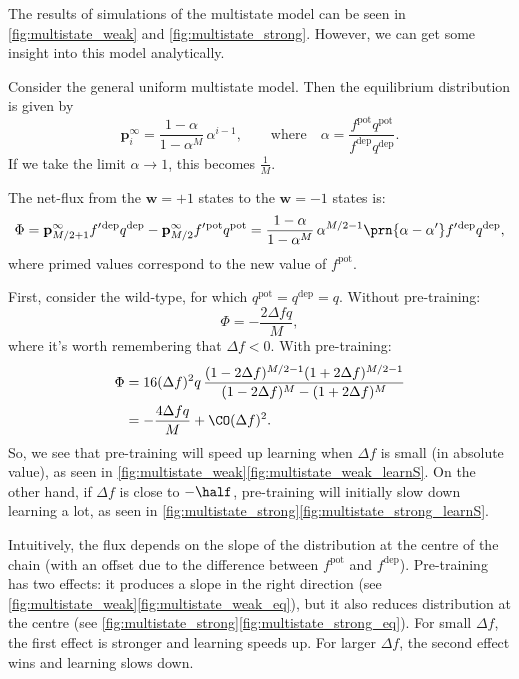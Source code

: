 \documentclass[12pt]{article}
\newcommand{\pr}{\mathbf{p}}
\newcommand{\eq}{\pr^\infty}
\newcommand{\w}{\mathbf{w}}
\newcommand{\pot}{^{\text{pot}}}
\newcommand{\dep}{^{\text{dep}}}
\begin{document}
The results of simulations of the multistate model can be seen in \autoref{fig:multistate_weak} and \autoref{fig:multistate_strong}.
However, we can get some insight into this model analytically.



Consider the general uniform multistate model.
Then the equilibrium distribution is given by
%
\begin{equation}\label{eq:mutltieq}
  \eq_i = \frac{1-\alpha}{1-\alpha^M}\,\alpha^{i-1},
  \qquad \text{where} \quad
  \alpha=\frac{f\pot q\pot}{f\dep q\dep}.
\end{equation}
%
If we take the limit $\alpha\rightarrow1$, this becomes $\frac{1}{M}$.

The net-flux from the $\w=+1$ states to the $\w=-1$ states is:
%
\begin{equation}\label{eq:multiflux}
  \Phi = \eq_{M/2+1}f'{}\dep q\dep - \eq_{M/2}f'{}\pot q\pot = \frac{1-\alpha}{1-\alpha^M}\,\alpha^{M/2-1}\prn{\alpha-\alpha'}f'{}\dep q\dep,
\end{equation}
%
where primed values correspond to the new value of $f\pot$.

First, consider the wild-type, for which $q\pot=q\dep=q$.
Without pre-training:
%
\begin{equation}\label{eq:multiWTnopre}
  \Phi = -\frac{2\Delta fq}{M},
\end{equation}
%
where it's worth remembering that $\Delta f<0$.
With pre-training:
%
\begin{equation}\label{eq:multiWTpre}
\begin{aligned}
  \Phi &= 16(\Delta f)^2q \, \frac{(1-2\Delta f)^{M/2-1} (1+2\Delta f)^{M/2-1}}
          {(1-2\Delta f)^M - (1+2\Delta f)^M} \\
       &= -\frac{4\Delta fq}{M} + \CO(\Delta f)^2.
\end{aligned}
\end{equation}
%
So, we see that pre-training will speed up learning when $\Delta f$ is small (in absolute value), as seen in \autoref{fig:multistate_weak}\ref{fig:multistate_weak_learnS}.
On the other hand, if $\Delta f$ is close to $-\half$, pre-training will initially slow down learning a lot, as seen in \autoref{fig:multistate_strong}\ref{fig:multistate_strong_learnS}.

Intuitively, the flux depends on the slope of the distribution at the centre of the chain (with an offset due to the difference between $f\pot$ and $f\dep$).
Pre-training has two effects: it produces a slope in the right direction (see \autoref{fig:multistate_weak}\ref{fig:multistate_weak_eq}), but it also reduces distribution at the centre (see \autoref{fig:multistate_strong}\ref{fig:multistate_strong_eq}).
For small $\Delta f$, the first effect is stronger and learning speeds up.
For larger $\Delta f$, the second effect wins and learning slows down.
\end{document}
